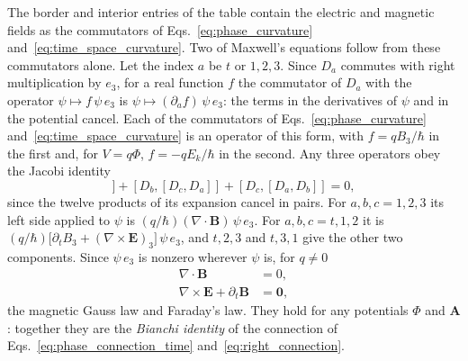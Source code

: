 \documentclass[aps,prd,onecolumn,tightenlines,nofootinbib,notitlepage,11pt,floatfix]{revtex4-2}
\theoremstyle{indentedtheorem}
\begin{document}
The border and interior entries of the table contain the electric and magnetic fields as the commutators of Eqs.~\eqref{eq:phase_curvature} and~\eqref{eq:time_space_curvature}. Two of Maxwell's equations follow from these commutators alone. Let the index $a$ be $t$ or $1,2,3$. Since $D_a$ commutes with right multiplication by $e_3$, for a real function $f$ the commutator of $D_a$ with the operator $\psi\mapsto f\,\psi\,e_3$ is $\psi\mapsto(\partial_af)\,\psi\,e_3$: the terms in the derivatives of $\psi$ and in the potential cancel. Each of the commutators of Eqs.~\eqref{eq:phase_curvature} and~\eqref{eq:time_space_curvature} is an operator of this form, with $f=qB_3/\hbar$ in the first and, for $V=q\Phi$, $f=-qE_k/\hbar$ in the second. Any three operators obey the Jacobi identity
\begin{equation}
    [D_a,[D_b,D_c]] + [D_b,[D_c,D_a]] + [D_c,[D_a,D_b]] = 0 ,
    \label{eq:jacobi}
\end{equation}
since the twelve products of its expansion cancel in pairs. For $a,b,c=1,2,3$ its left side applied to $\psi$ is $(q/\hbar)(\nabla\cdot\mathbf{B})\,\psi\,e_3$. For $a,b,c=t,1,2$ it is $(q/\hbar)\big[\partial_tB_3+(\nabla\times\mathbf{E})_3\big]\,\psi\,e_3$, and $t,2,3$ and $t,3,1$ give the other two components. Since $\psi\,e_3$ is nonzero wherever $\psi$ is, for $q\neq0$
\begin{align}
    \nabla\cdot\mathbf{B} &= 0 ,
    \label{eq:no_monopole} \\
    \nabla\times\mathbf{E}+\partial_t\mathbf{B} &= \mathbf{0} ,
    \label{eq:faraday}
\end{align}
the magnetic Gauss law and Faraday's law. They hold for any potentials $\Phi$ and $\mathbf{A}$: together they are the \emph{Bianchi identity} of the connection of Eqs.~\eqref{eq:phase_connection_time} and~\eqref{eq:right_connection}.
\end{document}
